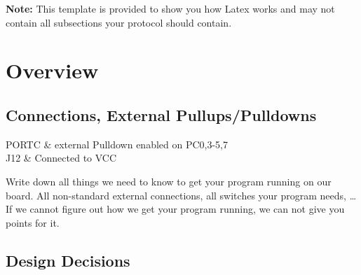 \documentclass[12pt,a4paper,titlepage,oneside]{article}
\begin{document}
\MakeTitleAndTOC




{\bf Note:} This template is provided to show you how Latex works and may
not contain all subsections your protocol should contain.


\section{Overview}

\subsection{Connections,  External Pullups/Pulldowns}

PORTC & external Pulldown enabled on PC0,3-5,7 \\
J12 & Connected to VCC \\
\eConnections

Write down all things we need to know to get your program running on our board. All non-standard external connections, all switches your program needs, \dots
If we cannot figure out how we get your program running, we can not give you points for it.


\subsection{Design Decisions}
\end{document}
